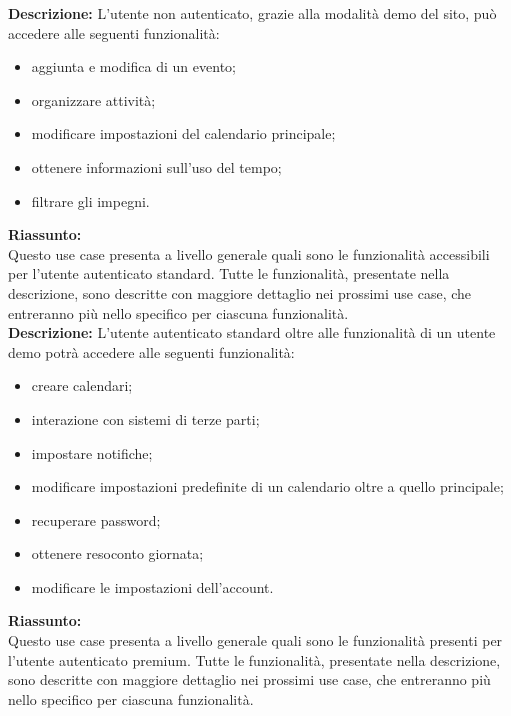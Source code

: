 \begin{listaPersonale}[UC]{}
\begin{listaPersonale2} [UC] {}
        \textbf{Descrizione:}
        L'utente non autenticato, grazie alla modalità demo del sito, può accedere alle seguenti funzionalità:
        \begin{itemize}
            \item aggiunta e modifica di un evento;
            \item organizzare attività;
            \item modificare impostazioni del calendario principale;
            \item ottenere informazioni sull'uso del tempo;
            \item filtrare gli impegni.
        \end{itemize}

        \textbf{Riassunto:} \\
        Questo use case presenta a livello generale quali sono le funzionalità accessibili per l'utente autenticato standard. Tutte le funzionalità, presentate nella descrizione, sono descritte con maggiore dettaglio nei prossimi use case, che entreranno più nello specifico per ciascuna funzionalità. \\
        \textbf{Descrizione:}
        L'utente autenticato standard oltre alle funzionalità di un utente demo potrà accedere alle seguenti funzionalità:
        \begin{itemize}
            \item creare calendari;
            \item interazione con sistemi di terze parti;
            \item impostare notifiche;
            \item modificare impostazioni predefinite di un calendario oltre a quello principale;
            \item recuperare password;
            \item ottenere resoconto giornata;
            \item modificare le impostazioni dell'account.
        \end{itemize}
        \textbf{Riassunto:} \\
        Questo use case presenta a livello generale quali sono le funzionalità presenti per l'utente autenticato premium. Tutte le funzionalità, presentate nella descrizione, sono descritte con maggiore dettaglio nei prossimi use case, che entreranno più nello specifico per ciascuna funzionalità. \\

\end{listaPersonale2}
\end{listaPersonale}
